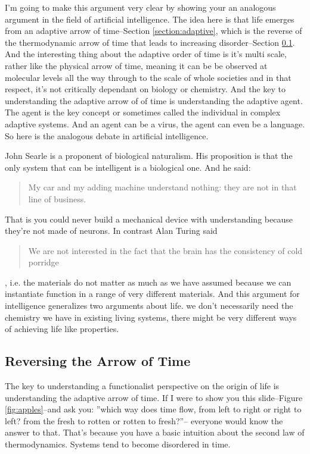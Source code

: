 \documentclass[]{article}
\begin{document}
I'm going to make this argument very clear by showing your an analogous argument in the field of artificial intelligence. The idea here is that life emerges from an adaptive arrow of time--Section \ref{section:adaptive}, which is the reverse of the thermodynamic arrow of time that leads to increasing disorder--Section \ref{section:reversing}. And the interesting thing about the adaptive order of time is it's multi scale, rather like the physical arrow of time, meaning it can be be observed at molecular levels all the way through to the scale of whole societies and in that respect, it's not critically dependant on biology or chemistry. And the key to understanding the adaptive arrow of of time is understanding the adaptive agent. The agent is the key concept or sometimes called the individual in complex adaptive systems. And an agent can be a virus, the agent can even be a language. So here is the analogous debate in artificial intelligence.

John Searle is a proponent of biological naturalism. His proposition is that the only system that can be intelligent is a biological one. And he said: \begin{quotation}
	My car and my adding machine 	understand nothing: they are not in that line of business.
\end{quotation} That is you could never build a mechanical device with understanding because they're not made of neurons. In contrast Alan Turing said 	\begin{quotation}
We are not interested in the fact that the brain has the consistency of cold porridge
\end{quotation}, i.e. the materials do not matter as much as we have assumed because we can instantiate function in a range of very different materials. And this argument for intelligence generalizes two arguments about life. we don't necessarily need the chemistry we have in existing living systems, there might be very different ways of achieving life like properties.



\subsection{Reversing the Arrow of Time}\label{section:reversing}

The key to understanding a functionalist perspective on the origin of life
is understanding the adaptive arrow of time.
If I were to show you this slide--Figure \ref{fig:apples}--and ask you: ''which
way does time flow, from left to right
or right to left? from the fresh to rotten or
rotten to fresh?''-- everyone would know the
answer to that. That's because you have
a basic intuition about the second law of thermodynamics.
Systems tend to become disordered in time.
\end{document}
